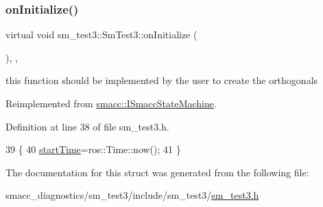 \subsubsection{\texorpdfstring{on\+Initialize()}{onInitialize()}}
{\footnotesize\ttfamily virtual void sm\+\_\+test3\+::\+Sm\+Test3\+::on\+Initialize (\begin{DoxyParamCaption}{ }\end{DoxyParamCaption})\hspace{0.3cm}{\ttfamily [inline]}, {\ttfamily [override]}, {\ttfamily [virtual]}}



this function should be implemented by the user to create the orthogonals 



Reimplemented from \hyperlink{classsmacc_1_1ISmaccStateMachine_ac2982c6c8283663e5e1e8a7c82f511ec}{smacc\+::\+I\+Smacc\+State\+Machine}.



Definition at line 38 of file sm\+\_\+test3.\+h.


\begin{DoxyCode}
39     \{
40         \hyperlink{namespacesm__test3_a3c530a2f1d2f50afbd4e56e96c1edd83}{startTime}=ros::Time::now();
41     \}
\end{DoxyCode}


The documentation for this struct was generated from the following file\+:\begin{DoxyCompactItemize}
\item 
smacc\+\_\+diagnostics/sm\+\_\+test3/include/sm\+\_\+test3/\hyperlink{sm__test3_8h}{sm\+\_\+test3.\+h}\end{DoxyCompactItemize}
